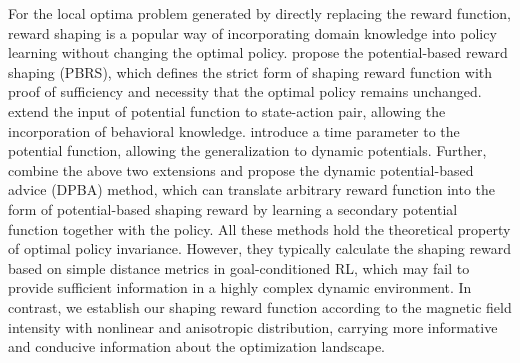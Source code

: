 \documentclass[journal]{IEEEtran}
\begin{document}
For the local optima problem generated by directly replacing the reward function, reward shaping is a popular way of incorporating domain knowledge into policy learning without changing the optimal policy.
\citet{ng1999policy} propose the potential-based reward shaping (PBRS), which defines the strict form of shaping reward function with proof of sufficiency and necessity that the optimal policy remains unchanged.
\citet{wiewiora2003principled} extend the input of potential function to state-action pair, allowing the incorporation of behavioral knowledge.
\citet{devlin2012dynamic} introduce a time parameter to the potential function, allowing the generalization to dynamic potentials.
Further, \citet{harutyunyan2015expressing} combine the above two extensions and propose the dynamic potential-based advice (DPBA) method, which can translate arbitrary reward function into the form of potential-based shaping reward by learning a secondary potential function together with the policy. 
All these methods hold the theoretical property of optimal policy invariance. 
However, they typically calculate the shaping reward based on simple distance metrics in goal-conditioned RL, which may fail to provide sufficient information in a highly complex dynamic environment.
In contrast, we establish our shaping reward function according to the magnetic field intensity with nonlinear and anisotropic distribution, carrying more informative and conducive information about the optimization landscape.
\end{document}
